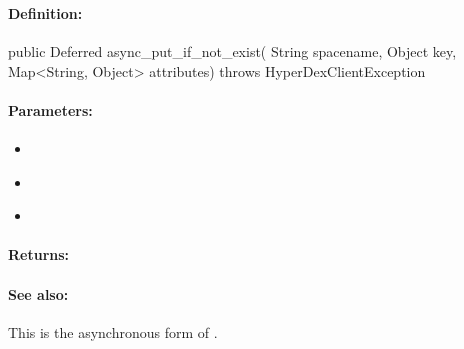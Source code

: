 \pagebreak
\subsubsection{}
\label{api:java:async_put_if_not_exist}


\paragraph{Definition:}
\begin{javacode}
public Deferred async_put_if_not_exist(
        String spacename,
        Object key,
        Map<String, Object> attributes) throws HyperDexClientException
\end{javacode}

\paragraph{Parameters:}
\begin{itemize}[noitemsep]
\item {}\\

\item {}\\

\item {}\\

\end{itemize}

\paragraph{Returns:}


\paragraph{See also:}  This is the asynchronous form of .

\pagebreak
\subsubsection{}
\label{api:java:del}


